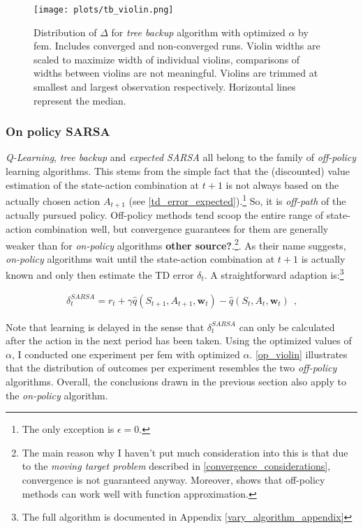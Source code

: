 \begin{figure}
	\texttt{[image: plots/tb\_violin.png]}
	\caption[Distribution of $\Delta$ for \emph{tree backup} algorithm with optimized $\alpha$ by \gls{fem}]{Distribution of $\Delta$ for \emph{tree backup} algorithm with optimized $\alpha$ by \gls{fem}. Includes converged and non-converged runs. Violin widths are scaled to maximize width of individual violins, comparisons of widths between violins are not meaningful. Violins are trimmed at smallest and largest observation respectively. Horizontal lines represent the median.}
	\label{tb_violin}
\end{figure}

\subsubsection{On policy SARSA}
\emph{Q-Learning}, \emph{tree backup} and \emph{expected SARSA} all belong to the family of \emph{off-policy} learning algorithms. This stems from the simple fact that the (discounted) value estimation of the state-action combination at $t+1$ is not always based on the actually chosen action $A_{t+1}$ (see \autoref{td_error_expected}).\footnote{The only exception is $\epsilon = 0$.}  So, it is \emph{off-path} of the actually pursued policy. Off-policy methods tend scoop the entire range of state-action combination well, but convergence guarantees for them are generally weaker than for \emph{on-policy} algorithms \parencite{sutton_reinforcement_2018} \textbf{other source?}.\footnote{The main reason why I haven't put much consideration into this is that due to the \emph{moving target problem} described in \autoref{convergence_considerations}, convergence is not guaranteed anyway. Moreover, \textcite{hettich_algorithmic_2021} shows that off-policy methods can work well with function approximation.}. As their name suggests, \emph{on-policy} algorithms wait until the state-action combination at $t+1$ is actually known and only then estimate the TD error $\delta_t$. A straightforward adaption is:\footnote{The full algorithm is documented in Appendix \ref{vary_algorithm_appendix}}

\begin{gather}\label{td_error_on_policy}
\delta_t^{SARSA} = r_t + \gamma \hat{q}(S_{t+1}, A_{t+1}, \boldsymbol{w}_t) - \hat{q}(S_t, A_t, \boldsymbol{w}_t) ~~ \text{,}
\end{gather}

Note that learning is delayed in the sense that $\delta_t^{SARSA}$ can only be calculated after the action in the next period has been taken. Using the optimized values of $\alpha$, I conducted one experiment per \gls{fem} with optimized $\alpha$. \autoref{op_violin} illustrates that the distribution of outcomes per experiment resembles the two \emph{off-policy} algorithms. Overall, the conclusions drawn in the previous section also apply to the \emph{on-policy} algorithm.

